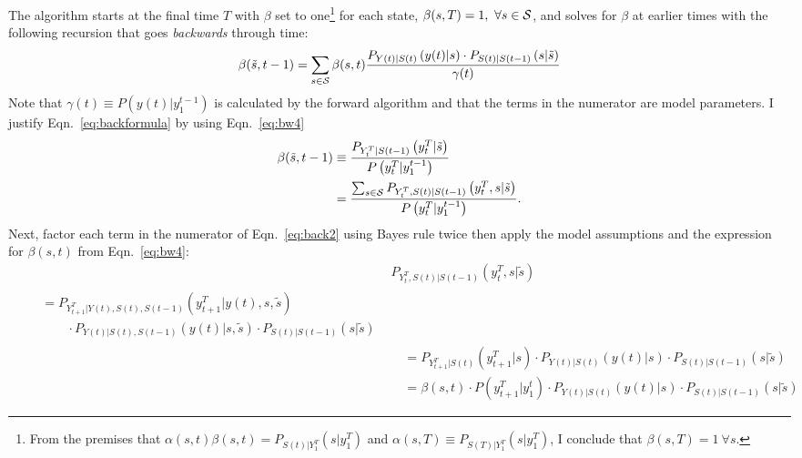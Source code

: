 \documentclass[]{article}
\newcommand{\ts}[3]{#1_{#2}^{#3}}                    %
\newcommand{\ti}[2]{{#1}{(#2)}}                  %
\newcommand{\states}{{\cal{S}}}
\begin{document}
The algorithm starts at the final time $T$ with $\beta$ set to
one\footnote{From the premises that $\alpha(s,t) \beta(s,t) =
  P_{\ti{S}{t}|\ts{Y}{1}{T}} \left(s|\ts{y}{1}{T} \right)$ and
  $\alpha(s,T) \equiv P_{S(T)|\ts{Y}{1}{T}}\left(s |\ts{y}{1}{T}
  \right)$, I conclude that $\beta(s,T) = 1 ~\forall s$.} %
for each state, $\beta(s,T) = 1,~\forall s \in \states$, and solves
for $\beta$ at earlier times with the following recursion that goes
\emph{backwards} through time:
\begin{equation}
  \label{eq:backformula}
  \beta({\tilde s},t-1) = \sum_{s\in\states} \beta(s,t)
  \frac{ P_{\ti{Y}{t}|\ti{S}{t}}
    \left(\ti{y}{t}|s \right) \cdot P_{\ti{S}{t}|\ti{S}{t-1}}
    \left(s|{\tilde s} \right)} {\ti{\gamma}{t}}
\end{equation}
Note that ${\ti{\gamma}{t} \equiv P \left( \ti{y}{t} |
    \ts{y}{1}{t-1}\right)}$ is calculated by the forward algorithm and
that the terms in the numerator are model parameters.  I justify
Eqn.~\eqref{eq:backformula} by using Eqn.~\eqref{eq:bw4}
\begin{align}
  \beta({\tilde s},t-1) & \equiv \frac{P_{\ts{Y}{t}{T}|\ti{S}{t-1}}
    \left(\ts{y}{t}{T}|{\tilde s} \right)}
  {P \left(\ts{y}{t}{T}|\ts{y}{1}{t-1} \right)} \\
  \label{eq:back2}
  &= \frac{\sum_{s\in\states} P_{\ts{Y}{t}{T},\ti{S}{t}|\ti{S}{t-1}}
    \left(\ts{y}{t}{T},s|{\tilde s} \right)} {P
    \left(\ts{y}{t}{T}|\ts{y}{1}{t-1} \right)}.
\end{align}
Next, factor each term in the numerator of Eqn.~\eqref{eq:back2} using
Bayes rule twice then apply the model assumptions and the expression
for $\beta(s,t)$ from Eqn.~\eqref{eq:bw4}:
\begin{align*}
  & P_{\ts{Y}{t}{T},\ti{S}{t}|\ti{S}{t-1}}\left( \ts{y}{t}{T},s|{\tilde s} \right)\\
  \begin{split}
    &\quad= P_{\ts{Y}{t+1}{T}|\ti{Y}{t},\ti{S}{t},\ti{S}{t-1}}
       \left(\ts{y}{t+1}{T}|\ti{y}{t},s,{\tilde s} \right)\\
    &\quad\qquad \cdot P_{\ti{Y}{t}|\ti{S}{t},\ti{S}{t-1}} \left(\ti{y}{t}|s,{\tilde s}
       \right)\cdot P_{\ti{S}{t}|\ti{S}{t-1}} \left(s|{\tilde s} \right)
  \end{split}\\
  &\quad= P_{\ts{Y}{t+1}{T}|\ti{S}{t}} \left(\ts{y}{t+1}{T}|s\right)
           \cdot P_{\ti{Y}{t}|\ti{S}{t}} \left(\ti{y}{t}|s \right) \cdot
            P_{\ti{S}{t}|\ti{S}{t-1}} \left(s|{\tilde s} \right) \\
  &\quad= \beta(s,t) \cdot P \left(\ts{y}{t+1}{T}|\ts{y}{1}{t} \right)
           \cdot P_{\ti{Y}{t}|\ti{S}{t}} \left(\ti{y}{t}|s \right) \cdot
            P_{\ti{S}{t}|\ti{S}{t-1}} \left(s|{\tilde s} \right)
\end{align*}
\end{document}
